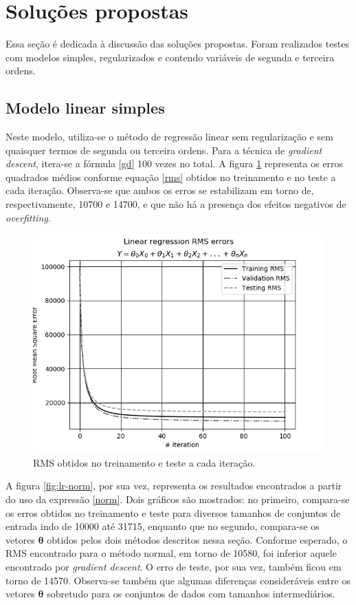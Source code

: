 \documentclass[10pt,twocolumn,letterpaper]{article}
\begin{document}
\section{Soluções propostas}

Essa seção é dedicada à discussão das soluções propostas. Foram realizados testes com modelos simples, regularizados e contendo variáveis de segunda e terceira ordens.

\subsection {Modelo linear simples}

Neste modelo, utiliza-se o método de regressão linear sem regularização e sem quaisquer termos de segunda ou terceira ordens. Para a técnica de \textit{gradient descent}, itera-se a fórmula \ref{gd} 100 vezes no total. A figura \ref{fig:lr-gd} representa os erros quadrados médios conforme equação \ref{rms} obtidos no treinamento e no teste a cada iteração. Observa-se que ambos os erros se estabilizam em torno de, respectivamente, 10700 e 14700, e que não há a presença dos efeitos negativos de \textit {overfitting}.

\begin{figure}
    \centering
    \includegraphics[width=0.9\columnwidth]{img/lr-gd.png}
    \caption{RMS obtidos no treinamento e teste a cada iteração.}
    \label{fig:lr-gd}
\end{figure}

A figura \ref{fig:lr-norm}, por sua vez, representa os resultados encontrados a partir do uso da expressão \ref{norm}. Dois gráficos são mostrados: no primeiro, compara-se os erros obtidos no treinamento e teste para diversos tamanhos de conjuntos de entrada indo de 10000 até 31715, enquanto que no segundo, compara-se os vetores \(\bm{\theta}\) obtidos pelos dois métodos descritos nessa seção. Conforme esperado, o RMS encontrado para o método normal, em torno de 10580, foi inferior aquele encontrado por \textit{gradient descent}. O erro de teste, por sua vez, também ficou em torno de 14570. Observa-se também que algumas diferenças consideráveis entre os vetores \(\bm{\theta}\) sobretudo para os conjuntos de dados com tamanhos intermediários.
\end{document}
